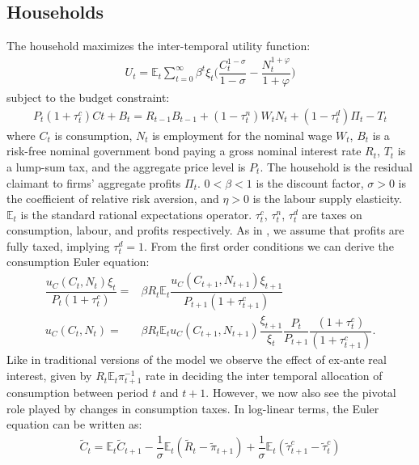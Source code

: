 \documentclass[11pt]{article}
\newcommand{\bb}{\bigbreak\noindent}
\begin{document}
\begin{spacing}{2}
\subsection{Households}
The household maximizes the inter-temporal utility function:
\begin{align}
	 U_t = \mathbb{E}_t \sum_{t=0}^{\infty} \beta^t \xi_t \bigg( \dfrac{C_t^{1-\sigma}}{1-\sigma} - \dfrac{N_t^{1+\varphi}}{1+\varphi} \bigg) 
\end{align}
subject to the budget constraint:
\begin{align}
	P_t(1+\tau_t^c)Ct + B_t = R_{t-1}B_{t-1} + (1 - \tau_t^n)W_t N_t + (1 - \tau_t^d)\Pi_t -  T_t
\end{align}
where $C_t$ is consumption, $N_t$ is employment for the nominal wage $W_t$, $B_t$ is a risk-free nominal government bond paying a gross nominal interest rate $R_t$, $T_t$ is a lump-sum tax, and the aggregate price level is $P_t$. The household is the residual claimant to firms' aggregate profits $\Pi_t$. $0 < \beta < 1$ is the discount factor, $\sigma > 0$ is the coefficient of relative risk aversion, and $\eta > 0$ is the labour supply elasticity. $\mathbb{E}_t$ is the standard rational expectations operator. $\tau_t^c$, $\tau_t^n$, $\tau_t^d$ are taxes on consumption, labour, and profits respectively. As in \cite{correia2013unconventional}, we assume that profits are fully taxed, implying $\tau_t^d = 1$.
\bb
From the first order conditions we can derive the consumption Euler equation:
\begin{align}
	\dfrac{u_C(C_t, N_t)\xi_t}{P_t(1+\tau_t^c)} =& \beta R_t \mathbb{E}_t \dfrac{u_C(C_{t+1}, N_{t+1}) \xi_{t+1}}{P_{t+1}(1+\tau_{t+1}^c)}\\
	u_C(C_t, N_t) =& \beta R_t \mathbb{E}_t u_C(C_{t+1}, N_{t+1}) \dfrac{\xi_{t+1}}{\xi_t} \dfrac{P_t}{P_{t+1}} \dfrac{(1+\tau_{t}^c)}{(1+\tau_{t+1}^c)}.
\end{align}
Like in traditional versions of the model we observe the effect of ex-ante real interest, given by $R_t\mathbb{E}_t\pi_{t+1}^{-1}$ rate in deciding the inter temporal allocation of consumption between period $t$ and $t + 1$. However, we now also see the pivotal role played by changes in consumption taxes. 
 In log-linear terms, the Euler equation can be written as:
 \begin{align}
 	\tilde{C}_t = \mathbb{E}_t \tilde{C}_{t+1}  - \dfrac{1}{\sigma}\mathbb{E}_t(\tilde{R}_t - \tilde{\pi}_{t+1}) + \dfrac{1}{\sigma}\mathbb{E}_t(\tilde{\tau}_{t+1}^c - \tilde{\tau}_{t}^c)
 \end{align}

\end{spacing}
\end{document}
